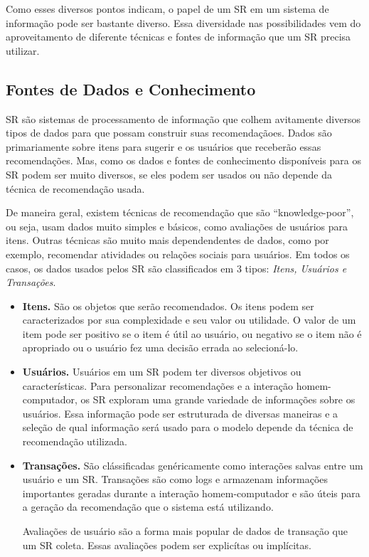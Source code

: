 \par

Como esses diversos pontos indicam, o papel de um SR em um sistema de informação pode ser bastante diverso. Essa diversidade nas possibilidades vem do aproveitamento de diferente técnicas e fontes de informação que um SR precisa utilizar.

\subsection{Fontes de Dados e Conhecimento}

SR são sistemas de processamento de informação que colhem avitamente diversos tipos de dados para que possam construir suas recomendaçãoes. Dados são primariamente sobre itens para sugerir e os usuários que receberão essas recomendações. Mas, como os dados e fontes de conhecimento disponíveis para os SR podem ser muito diversos, se eles podem ser usados ou não depende da técnica de recomendação usada.

\par

De maneira geral, existem técnicas de recomendação que são ``knowledge-poor'', ou seja, usam dados muito simples e básicos, como avaliações de usuários para itens. Outras técnicas são muito mais dependendentes de dados, como por exemplo, recomendar atividades ou relações sociais para usuários. Em todos os casos, os dados usados pelos SR são classificados em 3 tipos: \emph{Itens, Usuários e Transações}.

\begin{itemize}
  \item \textbf{Itens.}  São os objetos que serão recomendados. Os itens podem ser caracterizados por sua complexidade e seu valor ou utilidade. O valor de um item pode ser positivo se o item é útil ao usuário, ou negativo se o item não é apropriado ou o usuário fez uma decisão errada ao selecioná-lo.

  \item \textbf{Usuários.} Usuários em um SR podem ter diversos objetivos ou características. Para personalizar recomendações e a interação homem-computador, os SR exploram uma grande variedade de informações sobre os usuários. Essa informação pode ser estruturada de diversas maneiras e a seleção de qual informação será usado para o modelo depende da técnica de recomendação utilizada.

  \item \textbf{Transações.} São clássificadas genéricamente como interações salvas entre um usuário e um SR. Transações são como logs e armazenam informações importantes geradas durante a interação homem-computador e são úteis para a geração da recomendação que o sistema está utilizando.
    \par
    Avaliações de usuário são a forma mais popular de dados de transação que um SR coleta. Essas avaliações podem ser explicítas ou implícitas.

\end{itemize}

